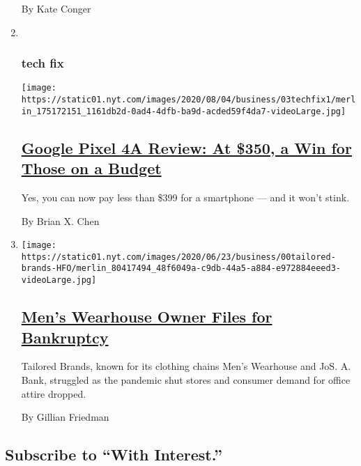 \begin{enumerate}
  By Kate Conger
\item ~
  \hypertarget{tech-fix}{%
  \subsubsection{tech fix}\label{tech-fix}}

  \texttt{[image: https://static01.nyt.com/images/2020/08/04/business/03techfix1/merlin\_175172151\_1161db2d-0ad4-4dfb-ba9d-acded59f4da7-videoLarge.jpg]}

  \hypertarget{google-pixel-4a-review-at-350-a-win-for-those-on-a-budget}{%
  \subsection{\texorpdfstring{\href{/2020/08/03/technology/personaltech/google-pixel-4a-review.html}{Google
  Pixel 4A Review: At \$350, a Win for Those on a
  Budget}}{Google Pixel 4A Review: At \$350, a Win for Those on a Budget}}\label{google-pixel-4a-review-at-350-a-win-for-those-on-a-budget}}

  Yes, you can now pay less than \$399 for a smartphone --- and it won't
  stink.

  By Brian X. Chen
\item
  \texttt{[image: https://static01.nyt.com/images/2020/06/23/business/00tailored-brands-HFO/merlin\_80417494\_48f6049a-c9db-44a5-a884-e972884eeed3-videoLarge.jpg]}

  \hypertarget{mens-wearhouse-owner-files-for-bankruptcy}{%
  \subsection{\texorpdfstring{\href{/2020/08/03/business/tailored-brands-mens-wearhouse-bankruptcy.html}{Men's
  Wearhouse Owner Files for
  Bankruptcy}}{Men's Wearhouse Owner Files for Bankruptcy}}\label{mens-wearhouse-owner-files-for-bankruptcy}}

  Tailored Brands, known for its clothing chains Men's Wearhouse and
  JoS. A. Bank, struggled as the pandemic shut stores and consumer
  demand for office attire dropped.

  By Gillian Friedman
\end{enumerate}

\hypertarget{subscribe-to-with-interest}{%
\subsection{Subscribe to ``With
Interest.''}\label{subscribe-to-with-interest}}

